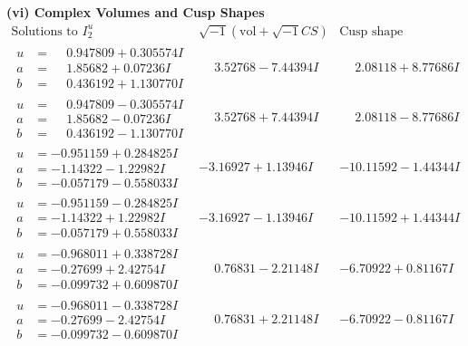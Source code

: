 \documentclass[1p]{elsarticle_modified}
\theoremstyle{definition}
\newcommand{\I}{\sqrt{-1}}
\begin{document}
\newpage\flushleft \textbf{(vi) Complex Volumes and Cusp Shapes}
$$\begin{array}{c|c|c}  
\text{Solutions to }I^u_{2}& \I (\text{vol} + \sqrt{-1}CS) & \text{Cusp shape}\\
 \hline 
\begin{aligned}
u &= \phantom{-}0.947809 + 0.305574 I \\
a &= \phantom{-}1.85682 + 0.07236 I \\
b &= \phantom{-}0.436192 + 1.130770 I\end{aligned}
 & \phantom{-}3.52768 - 7.44394 I & \phantom{-}2.08118 + 8.77686 I \\ \hline\begin{aligned}
u &= \phantom{-}0.947809 - 0.305574 I \\
a &= \phantom{-}1.85682 - 0.07236 I \\
b &= \phantom{-}0.436192 - 1.130770 I\end{aligned}
 & \phantom{-}3.52768 + 7.44394 I & \phantom{-}2.08118 - 8.77686 I \\ \hline\begin{aligned}
u &= -0.951159 + 0.284825 I \\
a &= -1.14322 - 1.22982 I \\
b &= -0.057179 - 0.558033 I\end{aligned}
 & -3.16927 + 1.13946 I & -10.11592 - 1.44344 I \\ \hline\begin{aligned}
u &= -0.951159 - 0.284825 I \\
a &= -1.14322 + 1.22982 I \\
b &= -0.057179 + 0.558033 I\end{aligned}
 & -3.16927 - 1.13946 I & -10.11592 + 1.44344 I \\ \hline\begin{aligned}
u &= -0.968011 + 0.338728 I \\
a &= -0.27699 + 2.42754 I \\
b &= -0.099732 + 0.609870 I\end{aligned}
 & \phantom{-}0.76831 - 2.21148 I & -6.70922 + 0.81167 I \\ \hline\begin{aligned}
u &= -0.968011 - 0.338728 I \\
a &= -0.27699 - 2.42754 I \\
b &= -0.099732 - 0.609870 I\end{aligned}
 & \phantom{-}0.76831 + 2.21148 I & -6.70922 - 0.81167 I \\ \hline\begin{aligned}

\end{aligned}
\end{array}$$
\end{document}
